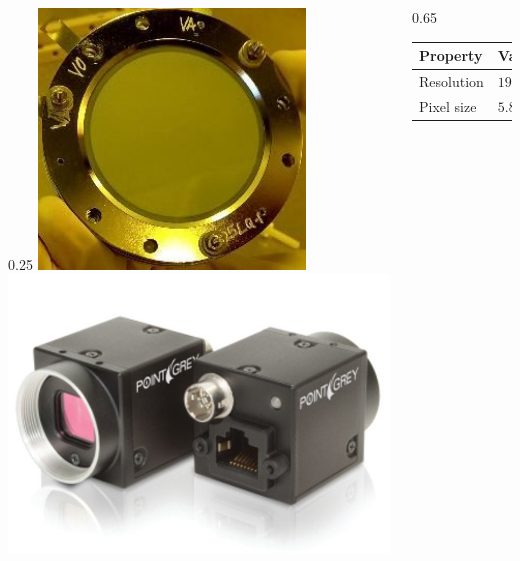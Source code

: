 \begin{frame}
  \begin{columns}[T]
    \begin{column}{0.25\textwidth}
      \centering
      \includegraphics[width=0.7\textwidth]{03_SIM/fig/fig000_MCP_photo}
      \includegraphics[width=1\textwidth]{03_SIM/fig/fig000_MCP_camera}
    \end{column}
    \begin{column}{0.65\textwidth}
      \begin{tabularx}{\linewidth}{XX}
        \toprule
        Property        & Value                                            \\
        \midrule
        Resolution      & $1936\,\mathrm{(H)}\,\times\,1216\,\mathrm{(V)}$ \\
        Pixel size      & $5.86\,\mathrm{\mu m}$                           \\

\end{tabularx}
\end{column}
\end{columns}
\end{frame}
